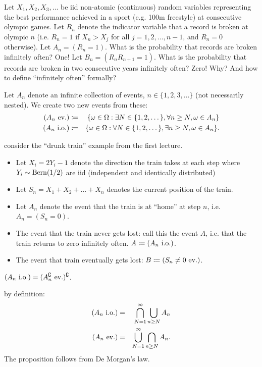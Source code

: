 \documentclass{article}
\begin{document}
 Let $X_1, X_2, X_3, \dots$ be iid non-atomic (continuous) random variables representing the best performance achieved in a sport (e.g. 100m freestyle) at consecutive olympic games. Let $R_n$ denote the indicator variable that a record is broken at olympic $n$ (i.e. $R_n = 1$ if $X_n > X_j$ for all $j = 1, 2, \dots, n-1$, and $R_n = 0$ otherwise). Let $A_n = (R_n = 1)$. What is the probability that records are broken infinitely often? One! Let $B_n = (R_n R_{n+1} = 1)$. What is the probability that records are broken in two consecutive years infinitely often? Zero! Why? And how to define ``infinitely often'' formally?

 Let $A_n$ denote an infinite collection of events, $n\in\{1,2,3,\dots\}$ (not necessarily nested). We create two new events from these:
\begin{eqnarray*}
(A_n\text{ ev.}) &\coloneqq& \{\omega \in \Omega : \exists N \in \{1, 2, \dots\}, \forall n\ge N, \omega \in A_n \} \\
(A_n\text{ i.o.}) &\coloneqq& \{\omega \in \Omega : \forall N \in \{1, 2, \dots\}, \exists n\ge N, \omega \in A_n \}.
\end{eqnarray*}

 consider the ``drunk train'' example from the first lecture.  
\begin{itemize}
  \item Let $X_i = 2Y_i - 1$ denote the direction the train takes at each step where $Y_i \sim \operatorname{Bern}(1/2)$ are iid (independent and identically distributed)
  \item Let $S_n = X_1 + X_2 + \dots + X_n$ denotes the current position of the train. 
  \item Let $A_n$ denote the event that the train is at ``home'' at step $n$, i.e. $A_n = (S_n = 0)$.
  \item The event that the train never gets lost: call this the event $A$, i.e. that the train returns to zero infinitely often. $A \coloneqq (A_n\text{ i.o.})$.
  \item The event that train eventually gets lost: $B \coloneqq (S_n \neq 0\text{ ev.})$.
\end{itemize}

 $(A_n\text{ i.o.}) = (A_n^\complement\text{ ev.})^\complement$.

 by definition:
\begin{eqnarray*}
(A_n\text{ i.o.}) &=& \bigcap_{N=1}^\infty \bigcup_{n\ge N} A_n \\
(A_n\text{ ev.}) &=& \bigcup_{N=1}^\infty \bigcap_{n\ge N} A_n.
\end{eqnarray*}
The proposition follows from De Morgan's law.
\end{document}
